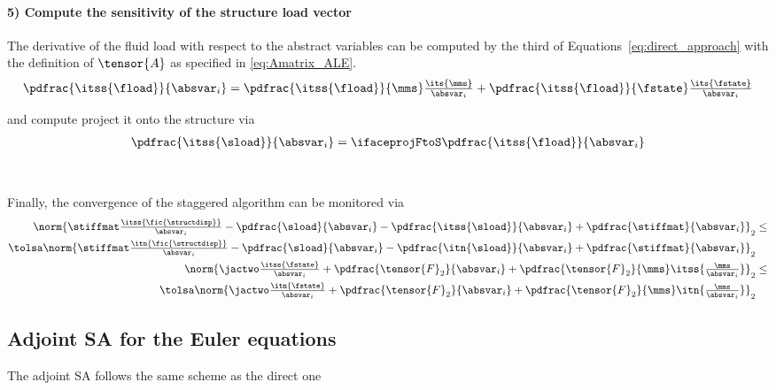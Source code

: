 \documentclass[../main.tex]{subfiles}
\begin{document}
\paragraph{5) Compute the sensitivity of the structure load vector}
The derivative of the fluid load with respect to the abstract variables can be computed by the third of Equations~\eqref{eq:direct_approach} with the definition of $\tensor{A}$ as specified in \eqref{eq:Amatrix_ALE}.
\begin{align}\label{eq:deriv_floadBYabsvar}
\pdfrac{\itss{\fload}}{\absvar_i} =
\pdfrac{\itss{\fload}}{\mms}    \tfrac{\its{\mms}}   {\absvar_i} +
\pdfrac{\itss{\fload}}{\fstate} \tfrac{\its{\fstate}}{\absvar_i}
\end{align}

and compute project it onto the structure via
\begin{align}
\pdfrac{\itss{\sload}}{\absvar_i} = \ifaceprojFtoS \pdfrac{\itss{\fload}}{\absvar_i}
\end{align}
~\\
~\\
Finally, the convergence of the staggered algorithm can be monitored via
\begin{align}
\begin{split}
  \norm{ \stiffmat \tfrac{ \itss{\fic{\structdisp}} }{\absvar_i}  -  \pdfrac{\sload}{\absvar_i} - \pdfrac{\itss{\sload}}{\absvar_i}  +  \pdfrac{\stiffmat}{\absvar_i}}_{2} &
  \leq \\
  \tolsa \norm{ \stiffmat \tfrac{ \itn{\fic{\structdisp}}  }{\absvar_i}  -  \pdfrac{\sload}{\absvar_i} - \pdfrac{\itn{\sload}}{\absvar_i}  +  \pdfrac{\stiffmat}{\absvar_i}}_{2} &
\end{split} &
\nonumber\\
\begin{split}
  \norm{\jactwo \tfrac{\itss{\fstate}}{\absvar_i} + \pdfrac{\tensor{F}_2}{\absvar_i} + \pdfrac{\tensor{F}_2}{\mms} \itss{\tfrac{\mms}{\absvar_i} }   }_{2} &
  \leq \\
  \tolsa \norm{\jactwo \tfrac{\itn{\fstate}}{\absvar_i} + \pdfrac{\tensor{F}_2}{\absvar_i} + \pdfrac{\tensor{F}_2}{\mms} \itn{\tfrac{\mms}{\absvar_i} }   }_{2} &
\end{split} &
\end{align}


\subsection{Adjoint \acl{SA} for the Euler equations}\label{sec:adjoint_sa}
The adjoint SA follows the same scheme as the direct one
\end{document}

